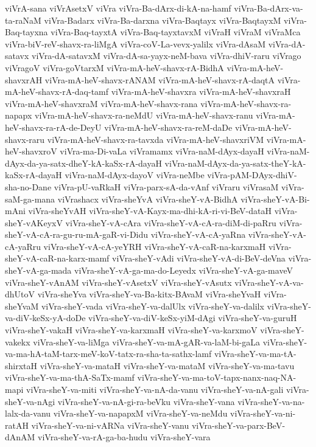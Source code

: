 {viVrA-sana
viVrAsetxV
viVra
viVra-Ba-dArx-di-kA-na-hamf
viVra-Ba-dArx-va-ta-raNaM
viVra-Badarx
viVra-Ba-darxna
viVra-Baqtayx
viVra-BaqtayxM
viVra-Baq-tayxna
viVra-Baq-tayxtA
viVra-Baq-tayxtavxM
viVraH
viVraM
viVraMca
viVra-biV-reV-shavx-ra-liMgA
viVra-coV-La-vevx-yalilx
viVra-dAsaM
viVra-dA-satavx
viVra-dA-satavxM
viVra-dA-sa-yayx-neM-bava
viVra-dhiV-raru
viVrago
viVragoV
viVra-goVtarxM
viVra-mA-heV-shavx-rA-BidhA
viVra-mA-heV-shavxrAH
viVra-mA-heV-shavx-rANAM
viVra-mA-heV-shavx-rA-daqtA
viVra-mA-heV-shavx-rA-daq-tamf
viVra-mA-heV-shavxra
viVra-mA-heV-shavxraH
viVra-mA-heV-shavxraM
viVra-mA-heV-shavx-rana
viVra-mA-heV-shavx-ra-napapx
viVra-mA-heV-shavx-ra-neMdU
viVra-mA-heV-shavx-ranu
viVra-mA-heV-shavx-ra-rA-de-DeyU
viVra-mA-heV-shavx-ra-reM-daDe
viVra-mA-heV-shavx-raru
viVra-mA-heV-shavx-ra-tavxda
viVra-mA-heV-shavxriVM
viVra-mA-heV-shavxroV
viVra-ma-Di-vaLa
viVramamx
viVra-naM-dAyx-dayaH
viVra-naM-dAyx-da-ya-satx-dheY-kA-kaSx-rA-dayaH
viVra-naM-dAyx-da-ya-satx-theY-kA-kaSx-rA-dayaH
viVra-naM-dAyx-dayoV
viVra-neMbe
viVra-pAM-DAyx-dhiV-sha-no-Dane
viVra-pU-vaRkaH
viVra-parx-sA-da-vAnf
viVraru
viVrasaM
viVra-saM-ga-mana
viVrashacx
viVra-sheYvA
viVra-sheY-vA-BidhA
viVra-sheY-vA-Bi-mAni
viVra-sheYvAH
viVra-sheY-vA-Kayx-ma-dhi-kA-ri-vi-BeV-dataH
viVra-sheY-vAKeyxV
viVra-sheY-vA-cAra
viVra-sheY-vA-cA-ra-diM-di-paRru
viVra-sheY-vA-cA-ra-gu-ru-mA-gaR-vi-Didu
viVra-sheY-vA-cA-yaRna
viVra-sheY-vA-cA-yaRru
viVra-sheY-vA-cA-yeYRH
viVra-sheY-vA-caR-na-karxmaH
viVra-sheY-vA-caR-na-karx-mamf
viVra-sheY-vAdi
viVra-sheY-vA-di-BeV-deVna
viVra-sheY-vA-ga-mada
viVra-sheY-vA-ga-ma-do-Leyedx
viVra-sheY-vA-ga-maveV
viVra-sheY-vAnAM
viVra-sheY-vAsetxV
viVra-sheY-vAsutx
viVra-sheY-vA-va-dhUtoV
viVra-sheYva
viVra-sheY-va-Ba-kitx-BAvaM
viVra-sheYvaH
viVra-sheYvaM
viVra-sheY-vada
viVra-sheY-va-dalUlx
viVra-sheY-va-dalilx
viVra-sheY-va-diV-keSx-yA-doDe
viVra-sheY-va-diV-keSx-yiM-dAgi
viVra-sheY-va-guruH
viVra-sheY-vakaH
viVra-sheY-va-karxmaH
viVra-sheY-va-karxmoV
viVra-sheY-vakekx
viVra-sheY-va-liMga
viVra-sheY-va-mA-gAR-va-laM-bi-gaLa
viVra-sheY-va-ma-hA-taM-tarx-meV-koV-tatx-ra-sha-ta-sathx-lamf
viVra-sheY-va-ma-tA-shirxtaH
viVra-sheY-va-mataH
viVra-sheY-va-mataM
viVra-sheY-va-ma-tavu
viVra-sheY-va-ma-thA-SaTx-mamf
viVra-sheY-va-ma-toV-tapx-nanx-naq-NA-mapi
viVra-sheY-va-miti
viVra-sheY-va-nA-da-vanu
viVra-sheY-va-nA-gali
viVra-sheY-va-nAgi
viVra-sheY-va-nA-gi-ra-beVku
viVra-sheY-vana
viVra-sheY-va-na-lalx-da-vanu
viVra-sheY-va-napapxM
viVra-sheY-va-neMdu
viVra-sheY-va-ni-ratAH
viVra-sheY-va-ni-vARNa
viVra-sheY-vanu
viVra-sheY-va-parx-BeV-dAnAM
viVra-sheY-va-rA-ga-ba-hudu
viVra-sheY-vara
}
